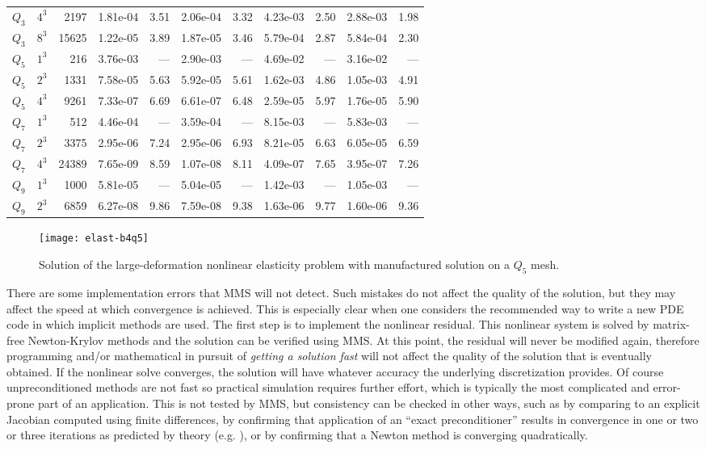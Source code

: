\begin{table}
\begin{tabular}{lrr rr rr rr rr}
$Q_3$ & $4^3$ & 2197 & 1.81e-04 & 3.51 & 2.06e-04 & 3.32 & 4.23e-03 & 2.50 & 2.88e-03 & 1.98 \\
$Q_3$ & $8^3$ & 15625 & 1.22e-05 & 3.89 & 1.87e-05 & 3.46 & 5.79e-04 & 2.87 & 5.84e-04 & 2.30\\
\midrule
$Q_5$ & $1^3$ & 216 & 3.76e-03 & --- & 2.90e-03 & --- & 4.69e-02 & --- & 3.16e-02 & --- \\
$Q_5$ & $2^3$ & 1331 & 7.58e-05 & 5.63 & 5.92e-05 & 5.61 & 1.62e-03 & 4.86 & 1.05e-03 & 4.91 \\
$Q_5$ & $4^3$ & 9261 & 7.33e-07 & 6.69 & 6.61e-07 & 6.48 & 2.59e-05 & 5.97 & 1.76e-05 & 5.90\\
\midrule
$Q_7$ & $1^3$ & 512 & 4.46e-04 & --- & 3.59e-04 & --- & 8.15e-03 & --- & 5.83e-03 & --- \\
$Q_7$ & $2^3$ & 3375 & 2.95e-06 & 7.24 & 2.95e-06 & 6.93 & 8.21e-05 & 6.63 & 6.05e-05 & 6.59 \\
$Q_7$ & $4^3$ & 24389 & 7.65e-09 & 8.59 & 1.07e-08 & 8.11 & 4.09e-07 & 7.65 & 3.95e-07 & 7.26\\
\midrule
$Q_9$ & $1^3$ & 1000 & 5.81e-05 & --- & 5.04e-05 & --- & 1.42e-03 & --- & 1.05e-03 & --- \\
$Q_9$ & $2^3$ & 6859 & 6.27e-08 & 9.86 & 7.59e-08 & 9.38 & 1.63e-06 & 9.77 & 1.60e-06 & 9.36 \\
\bottomrule
  \end{tabular}
\end{table}

\begin{figure}
  \centering\texttt{[image: elast-b4q5]}
  \caption{Solution of the large-deformation nonlinear elasticity problem with manufactured solution on a $Q_5$ mesh.}\label{fig:elastexact}
\end{figure}

There are some implementation errors that MMS will not detect.
Such mistakes do not affect the quality of the solution, but they may affect the speed at which convergence is achieved.
This is especially clear when one considers the recommended way to write a new PDE code in which implicit methods are used.
The first step is to implement the nonlinear residual.
This nonlinear system is solved by matrix-free Newton-Krylov methods and the solution can be verified using MMS.
At this point, the residual will never be modified again, therefore programming and/or mathematical in pursuit of \emph{getting a solution fast} will not affect the quality of the solution that is eventually obtained.
If the nonlinear solve converges, the solution will have whatever accuracy the underlying discretization provides.
Of course unpreconditioned methods are not fast so practical simulation requires further effort, which is typically the most complicated and error-prone part of an application.
This is not tested by MMS, but consistency can be checked in other ways, such as by comparing to an explicit Jacobian computed using finite differences, by confirming that application of an ``exact preconditioner'' results in convergence in one or two or three iterations as predicted by theory (e.g. \cite{murphy2000npi,ipsen2001note}), or by confirming that a Newton method is converging quadratically.


